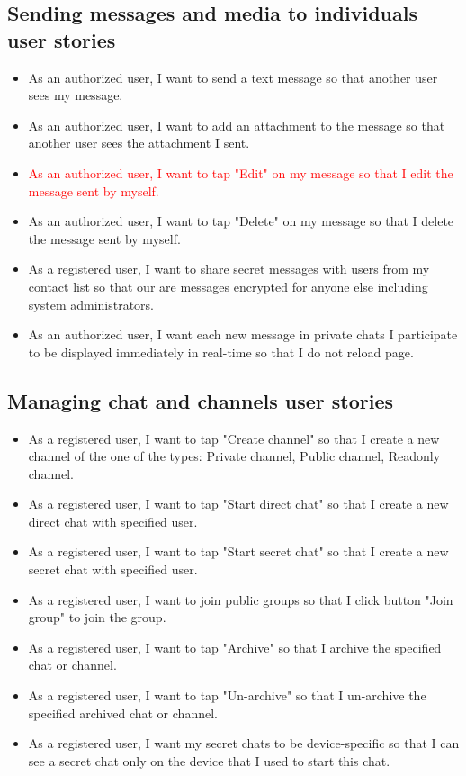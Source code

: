 \subsection{Sending messages and media to individuals user stories}
\label{subsec:sending-messages-and-media-feature-user-stories}
\begin{itemize}
    \item As an authorized user, I want to send a text message so that another user sees my message.
    \item As an authorized user, I want to add an attachment to the message so that another user sees the attachment I sent.
    \item \textcolor{red}{As an authorized user, I want to tap "Edit" on my message so that I edit the message sent by myself.}
    \item As an authorized user, I want to tap "Delete" on my message so that I delete the message sent by myself.
    \item As a registered user, I want to share secret messages with users from my contact list so that our are
    messages encrypted for anyone else including system administrators.
    \item As an authorized user, I want each new message in private chats I participate to be displayed immediately
    in real-time so that I do not reload page.
\end{itemize}

\subsection{Managing chat and channels user stories}\label{subsec:creating-groups-feature-user-stories}
\begin{itemize}
    \item As a registered user, I want to tap "Create channel" so that I create a new channel of the one of the types:
    Private channel, Public channel, Readonly channel.
    \item As a registered user, I want to tap "Start direct chat" so that I create a new direct chat with specified user.
    \item As a registered user, I want to tap "Start secret chat" so that I create a new secret chat with specified user.
    \item As a registered user, I want to join public groups so that I click button "Join group" to join the group.
    \item As a registered user, I want to tap "Archive" so that I archive the specified chat or channel.
    \item As a registered user, I want to tap "Un-archive" so that I un-archive the specified archived chat or channel.
    \item As a registered user, I want my secret chats to be device-specific so that I can see a secret chat only on the device that I used to start this chat.
\end{itemize}

